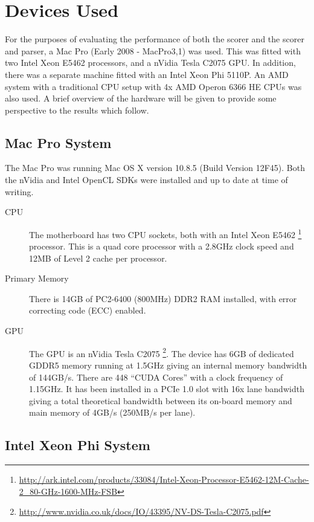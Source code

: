 \section{Devices Used}

For the purposes of evaluating the performance of both the scorer and the scorer
and parser, a Mac Pro (Early 2008 - MacPro3,1) was used. This was fitted with
two Intel Xeon E5462 processors, and a nVidia Tesla C2075 GPU. In addition,
there was a separate machine fitted with an Intel Xeon Phi 5110P. An AMD system
with a traditional CPU setup with 4x AMD Operon 6366 HE CPUs was also used. A
brief overview of the hardware will be given to provide some perspective to the
results which follow.

\subsection{Mac Pro System}

The Mac Pro was running Mac OS X version 10.8.5 (Build Version 12F45). Both the
nVidia and Intel OpenCL SDKs were installed and up to date at time of writing.

\begin{description}

\item[CPU] The motherboard has two CPU sockets, both with an Intel Xeon E5462
\footnote{\url{http://ark.intel.com/products/33084/Intel-Xeon-Processor-E5462-12M-Cache-2_80-GHz-1600-MHz-FSB}}
processor. This is a quad core processor with a 2.8GHz clock speed and 12MB of
Level 2 cache per processor.

\item[Primary Memory] There is 14GB of PC2-6400 (800MHz) DDR2 RAM installed,
with error correcting code (ECC) enabled.

\item[GPU] The GPU is an nVidia Tesla C2075
\footnote{\url{http://www.nvidia.co.uk/docs/IO/43395/NV-DS-Tesla-C2075.pdf}}.
The device has 6GB of dedicated GDDR5 memory running at 1.5GHz giving an
internal memory bandwidth of 144GB/s. There are 448 ``CUDA Cores'' with a clock
frequency of 1.15GHz. It has been installed in a PCIe 1.0 slot with 16x lane
bandwidth giving a total theoretical bandwidth between its on-board memory and
main memory of 4GB/s (250MB/s per lane).

\end{description}

\subsection{Intel Xeon Phi System}


